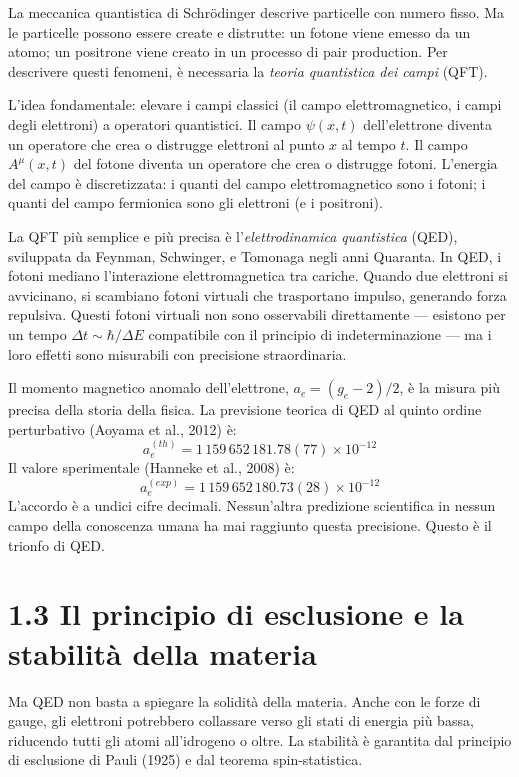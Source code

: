 \documentclass[11.5pt,a4paper,openany]{book}
\theoremstyle{remark}
\begin{document}
La meccanica quantistica di Schrödinger descrive particelle con numero fisso. Ma le particelle possono essere create e distrutte: un fotone viene emesso da un atomo; un positrone viene creato in un processo di pair production. Per descrivere questi fenomeni, è necessaria la \textit{teoria quantistica dei campi} (QFT).

L'idea fondamentale: elevare i campi classici (il campo elettromagnetico, i campi degli elettroni) a operatori quantistici. Il campo $\psi(x,t)$ dell'elettrone diventa un operatore che crea o distrugge elettroni al punto $x$ al tempo $t$. Il campo $A^\mu(x,t)$ del fotone diventa un operatore che crea o distrugge fotoni. L'energia del campo è discretizzata: i quanti del campo elettromagnetico sono i fotoni; i quanti del campo fermionica sono gli elettroni (e i positroni).

La QFT più semplice e più precisa è l'\textit{elettrodinamica quantistica} (QED), sviluppata da Feynman, Schwinger, e Tomonaga negli anni Quaranta. In QED, i fotoni mediano l'interazione elettromagnetica tra cariche. Quando due elettroni si avvicinano, si scambiano fotoni virtuali che trasportano impulso, generando forza repulsiva. Questi fotoni virtuali non sono osservabili direttamente --- esistono per un tempo $\Delta t \sim \hbar/\Delta E$ compatibile con il principio di indeterminazione --- ma i loro effetti sono misurabili con precisione straordinaria.

Il momento magnetico anomalo dell'elettrone, $a_e = (g_e - 2)/2$, è la misura più precisa della storia della fisica. La previsione teorica di QED al quinto ordine perturbativo (Aoyama et al., 2012) è:
\[
a_e^{(th)} = 1\,159\,652\,181.78(77) \times 10^{-12}
\]
Il valore sperimentale (Hanneke et al., 2008) è:
\[
a_e^{(exp)} = 1\,159\,652\,180.73(28) \times 10^{-12}
\]
L'accordo è a undici cifre decimali. Nessun'altra predizione scientifica in nessun campo della conoscenza umana ha mai raggiunto questa precisione. Questo è il trionfo di QED.

\section{1.3 Il principio di esclusione e la stabilità della materia}

Ma QED non basta a spiegare la solidità della materia. Anche con le forze di gauge, gli elettroni potrebbero collassare verso gli stati di energia più bassa, riducendo tutti gli atomi all'idrogeno o oltre. La stabilità è garantita dal principio di esclusione di Pauli (1925) e dal teorema spin-statistica.
\end{document}
